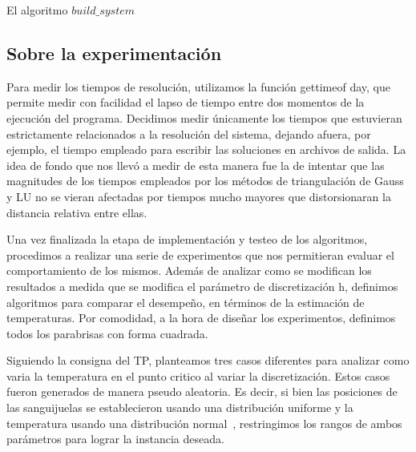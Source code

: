 \noindent{} 
\vspace{0.5cm}

El algoritmo $build\_system$


\subsection{Sobre la experimentación}

Para medir los tiempos de resolución, utilizamos la función gettimeof day, que permite medir con
facilidad el lapso de tiempo entre dos momentos de la ejecución del programa. Decidimos medir
únicamente los tiempos que estuvieran estrictamente relacionados a la resolución del sistema,
dejando afuera, por ejemplo, el tiempo empleado para escribir las soluciones en archivos de salida. La
idea de fondo que nos llevó a medir de esta manera fue la de intentar que las magnitudes de los tiempos
empleados por los métodos de triangulación de Gauss y LU no se vieran afectadas por tiempos mucho
mayores que distorsionaran la distancia relativa entre ellas.

Una vez finalizada la etapa de implementación y testeo de los algoritmos, procedimos a realizar una
serie de experimentos que nos permitieran evaluar el comportamiento de los mismos. Además de
analizar como se modifican los resultados a medida que se modifica el parámetro de discretización
h, definimos algoritmos para comparar el desempeño, en términos de la estimación de temperaturas.
Por comodidad, a la hora de diseñar los experimentos, definimos todos los parabrisas con forma cuadrada.

Siguiendo la consigna del TP, planteamos tres casos diferentes para analizar como varia la temperatura 
en el punto critico al variar la discretización. Estos casos fueron generados de manera pseudo aleatoria. Es decir, si bien las posiciones de las sanguijuelas se establecieron usando una distribución uniforme y la temperatura usando una distribución normal~\cite{proba}, restringimos los rangos de ambos parámetros para lograr la instancia deseada.
